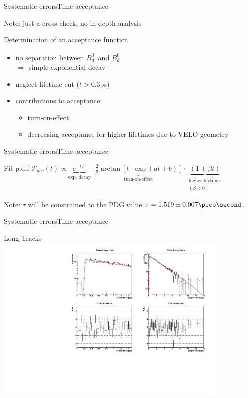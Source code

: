 \documentclass{beamer}
\newcommand{\Bd}{$B_d^0$}
\newcommand{\Bdbar}{$\overline{B_d^0}$}
\begin{document}
    \begin{frame}{Systematic errors}{Time acceptance}
    \begin{alert}{Note:}
    just a cross-check, no in-depth analysis
    \end{alert}
    \begin{block}{Determination of an acceptance function}
    \begin{itemize}
    \item no separation between \Bd \ and \Bdbar \\
          $\Rightarrow$ simple exponential decay
    \item neglect lifetime cut ($t > 0.3\text{ps}$)
    \item contributions to acceptance:
          \begin{itemize}
          \item turn-on-effect
          \item decreasing acceptance for higher lifetimes due to VELO geometry
          \end{itemize}
    \end{itemize}
    \end{block}
\end{frame}

\begin{frame}{Systematic errors}{Time acceptance}
    \begin{block}{Fit p.d.f}
    $\mathcal{P}_{acc}(t) \propto \underbrace{e^{-t/\tau}}_{\text{exp. decay}} \cdot \underbrace{\frac{2}{\pi}\arctan[t\cdot \exp(at+b)]}_{\text{turn-on-effect}} \cdot \underbrace{(1 + \beta t)}_{\substack{\text{higher lifetimes} \\(\beta<0)}}$
    \end{block}
    \begin{alert}{Note:}
    $\tau$ will be constrained to the PDG value $\tau = 1.519 \pm 0.007 \pico\second$.
    \end{alert}
\end{frame}

\begin{frame}{Systematic errors}{Time acceptance}
\begin{block}{Long Tracks}
\centering
\includegraphics[width=0.85\textwidth]{time_acceptance_fit_lt}
\end{block}
\end{frame}
\end{document}

